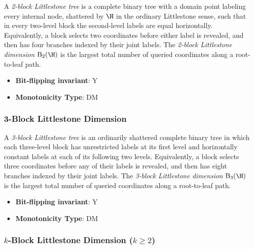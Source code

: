       \begin{definition}\label{def:2-block_littlestone_dimension}
      A \emph{2-block Littlestone tree} is a complete binary tree with a domain point labeling every internal node, shattered by $\H$ in the ordinary Littlestone sense, such that in every two-level block the second-level labels are equal horizontally.  Equivalently, a block selects two coordinates before either label is revealed, and then has four branches indexed by their joint labels.  The \emph{2-block Littlestone dimension} $\mathrm{B}_2(\H)$ is the largest total number of queried coordinates along a root-to-leaf path.
      \end{definition}
      \begin{itemize}
      \item {\bf Bit-flipping invariant}: Y
      \item {\bf Monotonicity Type}: DM
      \end{itemize}
\subsubsection{3-Block Littlestone Dimension}
      
      \begin{definition}\label{def:3-block_littlestone_dimension}
      A \emph{3-block Littlestone tree} is an ordinarily shattered complete binary tree in which each three-level block has unrestricted labels at its first level and horizontally constant labels at each of its following two levels.  Equivalently, a block selects three coordinates before any of their labels is revealed, and then has eight branches indexed by their joint labels.  The \emph{3-block Littlestone dimension} $\mathrm{B}_3(\H)$ is the largest total number of queried coordinates along a root-to-leaf path.
      \end{definition}
      \begin{itemize}
      \item {\bf Bit-flipping invariant}: Y
      \item {\bf Monotonicity Type}: DM
      \end{itemize}
\subsubsection{$k$-Block Littlestone Dimension ($k\ge2$)}
      
